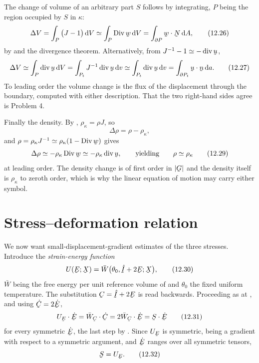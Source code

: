 The change of volume of an arbitrary part $S$ follows by integrating,
$P$ being the region occupied by $S$ in $\kappa$:
\begin{equation}
   \Delta V=\int_{P}\big(J-1\big)\,\dl V\simeq\int_{P}\Dvg\bw\,\dl V
   =\int_{\partial P}\ip\bw\bN\,\dl A ,
   \tag{12.26}\label{eq:12.26}
\end{equation}
by  and the divergence theorem. Alternatively, from
$J^{-1}-1\simeq-\dvg\bu$,
\begin{equation}
   \Delta V\simeq\int_{P}\dvg\bu\,\dl V
   =\int_{P_{t}}J^{-1}\dvg\bu\,\dl v
   \simeq\int_{P_{t}}\dvg\bu\,\dl v=\int_{\partial P_{t}}\ip\bu\bn\,\dl a .
   \tag{12.27}\label{eq:12.27}
\end{equation}
To leading order the volume change is the flux of the displacement
through the boundary, computed with either description. That the two
right-hand sides agree is Problem 4.

Finally the density. By , $\rho_{\kappa}=\rho J$, so
\begin{equation}
   \Delta\rho=\rho-\rho_{\kappa},
   \tag{12.28}\label{eq:12.28}
\end{equation}
and $\rho=\rho_{\kappa}J^{-1}\simeq\rho_{\kappa}(1-\Dvg\bw)$ gives
\begin{equation}
   \Delta\rho\simeq-\rho_{\kappa}\Dvg\bw\simeq-\rho_{\kappa}\dvg\bu,
   \qquad\text{yielding}\qquad \rho\simeq\rho_{\kappa}
   \tag{12.29}\label{eq:12.29}
\end{equation}
at leading order. The density change is of first order in $|\bG|$ and
the density itself is $\rho_{\kappa}$ to zeroth order, which is why the
linear equation of motion may carry either symbol.

\section{Stress--deformation relation}\label{sec:ch12stress}

We now want small-displacement-gradient estimates of the three stresses.
Introduce the \emph{strain-energy function}
\begin{equation}
   U(\bE;\bX)=\bar W\big(\theta_{0},\hI+2\bE;\bX\big),
   \tag{12.30}\label{eq:12.30}
\end{equation}
$\bar W$ being the free energy per unit reference volume of 
and $\theta_{0}$ the fixed uniform temperature. The substitution
$\bC=\hI+2\bE$ is  read backwards. Proceeding as at
, and using $\dot\bC=2\dot\bE$,
\begin{equation}
   U_{\bE}\cdot\dot\bE=\bar W_{\bC}\cdot\dot\bC
   =2\bar W_{\bC}\cdot\dot\bE=\bS\cdot\dot\bE
   \tag{12.31}\label{eq:12.31}
\end{equation}
for every symmetric $\dot\bE$, the last step by . Since
$U_{\bE}$ is symmetric, being a gradient with respect to a symmetric
argument, and $\dot\bE$ ranges over all symmetric tensors,
\begin{equation}
   \bS=U_{\bE} .
   \tag{12.32}\label{eq:12.32}
\end{equation}

